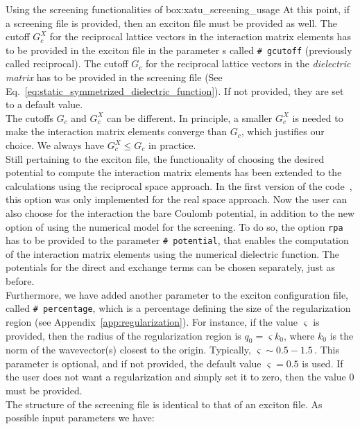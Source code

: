 \begin{mybox}{Using the screening functionalities of \xatu}{box:xatu_screening_usage}
    At this point, if a screening file is provided, then an exciton file must be provided as well.
    The cutoff $G^{X}_c$ for the reciprocal lattice vectors in the interaction matrix elements has to be provided in the exciton file in the parameter s called \texttt{\# gcutoff} (previously called reciprocal).
    The cutoff $G_c$ for the reciprocal lattice vectors in the \textit{dielectric matrix} has to be provided in the screening file (See Eq.~\eqref{eq:static_symmetrized_dielectric_function}).
    If not provided, they are set to a default value.
    \\
    The cutoffs $G_c$ and $G^{X}_c$ can be different.
    In principle, a smaller $G^{X}_c$ is needed to make the interaction matrix elements converge than $G_c$, which justifies our choice.
    We always have $G^{X}_c \leq G_c$ in practice.
    \\
    Still pertaining to the exciton file, the functionality of choosing the desired potential to compute the interaction matrix elements has been extended to the calculations using the reciprocal space approach.
    In the first version of the code~\cite{Xatu}, this option was only implemented for the real space approach.
    Now the user can also choose for the interaction the bare Coulomb potential, in addition to the new option of using the numerical model for the screening.
    To do so, the option \texttt{rpa} has to be provided to the parameter \texttt{\# potential}, that enables the computation of the interaction matrix elements using the numerical dielectric function.
    The potentials for the direct and exchange terms can be chosen separately, just as before.
    \\
    Furthermore, we have added another parameter to the exciton configuration file, called \texttt{\# percentage}, which is a percentage defining the size of the regularization region (see Appendix~\ref{app:regularization}).
    For instance, if the value $\varsigma$ is provided, then the radius of the regularization region is $q_0 = \varsigma k_0$, where $k_0$ is the norm of the wavevector(s) closest to the origin.
    Typically, $\varsigma \sim 0.5-1.5$\,.
    This parameter is optional, and if not provided, the default value $\varsigma=0.5$ is used.
    If the user does not want a regularization and simply set it to zero, then the value $0$ must be provided.
    \\
    The structure of the screening file is identical to that of an exciton file.
    As possible input parameters we have:


\end{mybox}
